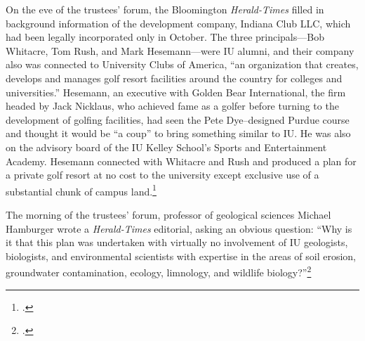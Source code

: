 \documentclass[
  american,
  letterpaper,
]{scrreprt}
\begin{document}
On the eve of the trustees' forum, the Bloomington \emph{Herald-Times}
filled in background information of the development company, Indiana
Club LLC, which had been legally incorporated only in October. The three
principals---Bob Whitacre, Tom Rush, and Mark Hesemann---were IU alumni,
and their company also was connected to University Clubs of America,
``an organization that creates, develops and manages golf resort
facilities around the country for colleges and universities.'' Hesemann,
an executive with Golden Bear International, the firm headed by Jack
Nicklaus, who achieved fame as a golfer before turning to the
development of golfing facilities, had seen the Pete Dye--designed
Purdue course and thought it would be ``a coup'' to bring something
similar to IU. He was also on the advisory board of the IU Kelley
School's Sports and Entertainment Academy. Hesemann connected with
Whitacre and Rush and produced a plan for a private golf resort at no
cost to the university except exclusive use of a substantial chunk of
campus land.\footnote{.}

The morning of the trustees' forum, professor of geological sciences
Michael Hamburger wrote a \emph{Herald-Times} editorial, asking an
obvious question: ``Why is it that this plan was undertaken with
virtually no involvement of IU geologists, biologists, and environmental
scientists with expertise in the areas of soil erosion, groundwater
contamination, ecology, limnology, and wildlife biology?''\footnote{.}
\end{document}
